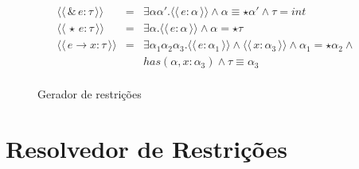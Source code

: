 \documentclass[a4paper,8pt]{article}
\newcommand{\constr}[1]{\ensuremath{\langle\langle\,#1\,\rangle\rangle}}
\begin{document}
\begin{figure}[H]
\[{\begin{array}{lcl}
                     \constr{\&\,e : \tau} & = & \exists \alpha
                                                 \alpha'. \constr{e :
                                                 \alpha} \land
                                                 \alpha \equiv \star \alpha'
                                                 \land \tau = int\\
                     \constr{\star\,e : \tau} & = & \exists
                                                    \alpha. \constr{e
                                                    : \alpha} \land
                                                    \alpha = \star \tau\\
                     \constr{e\to x : \tau} & = & \exists
                                                  \alpha_1\alpha_2\alpha_3. \constr{e
                                                  :\alpha_1} \land
                                                  \constr{x :
                                                  \alpha_3} \land
                                                  \alpha_1 = \star\alpha_2
                                                  \land\\
                          & & has(\alpha,x : \alpha_3) \land \tau
                              \equiv \alpha_3\\
            \end{array}}
       \]
       \centering
       \caption{Gerador de restrições}
       \label{figgen}
     \end{figure}

     \section{Resolvedor de Restrições}\label{constraintsolver}
\end{document}
